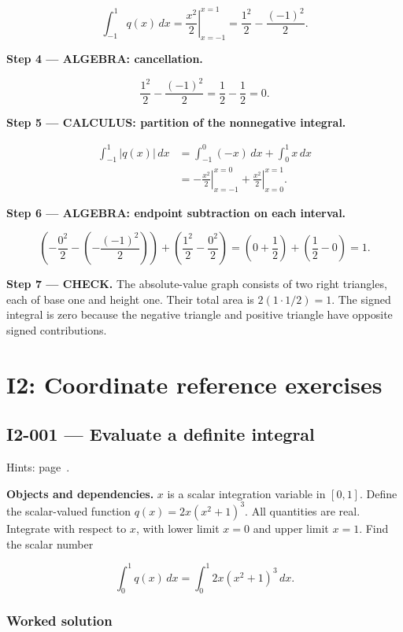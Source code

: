 \documentclass[11pt,oneside,openany]{book}
\begin{document}
\[
\int_{-1}^{1}q(x)\,dx
=\left.\frac{x^2}{2}\right|_{x=-1}^{x=1}
=\frac{1^2}{2}-\frac{(-1)^2}{2}.
\]

\begingroup\color{AlgebraBlue}
\textbf{Step 4 --- ALGEBRA: cancellation.}

\[
\frac{1^2}{2}-\frac{(-1)^2}{2}=\frac12-\frac12=0.
\]

\endgroup
\textbf{Step 5 --- CALCULUS: partition of the nonnegative integral.}

\[
\begin{aligned}
\int_{-1}^{1}|q(x)|\,dx
&=\int_{-1}^{0}(-x)\,dx+\int_0^1 x\,dx\\
&=\left.-\frac{x^2}{2}\right|_{x=-1}^{x=0}
+\left.\frac{x^2}{2}\right|_{x=0}^{x=1}.
\end{aligned}
\]

\begingroup\color{AlgebraBlue}
\textbf{Step 6 --- ALGEBRA: endpoint subtraction on each interval.}

\[
\left(-\frac{0^2}{2}-\left(-\frac{(-1)^2}{2}\right)\right)
+\left(\frac{1^2}{2}-\frac{0^2}{2}\right)
=\left(0+\frac12\right)+\left(\frac12-0\right)=1.
\]

\endgroup
\textbf{Step 7 --- CHECK.} The absolute-value graph consists of two right triangles,
each of base one and height one. Their total area is
\(2(1\cdot1/2)=1\). The signed integral is zero because the negative triangle
and positive triangle have opposite signed contributions.

\chapter{I2: Coordinate reference exercises}
\markright{}
\section{I2-001 --- Evaluate a definite integral}
\label{problem:I2-001}
{\small Hints: page~\pageref{hints:I2-001}.}\par\medskip

\textbf{Objects and dependencies.} \(x\) is a scalar integration variable in \([0,1]\). Define the scalar-valued function \(q(x)=2x(x^2+1)^3\). All quantities are real. Integrate with respect to \(x\), with lower limit \(x=0\) and upper limit \(x=1\). Find the scalar number

\[
\int_{0}^{1} q(x)\,dx
=\int_{0}^{1} 2x(x^2+1)^3\,dx.
\]
\subsection*{Worked solution}
\end{document}
